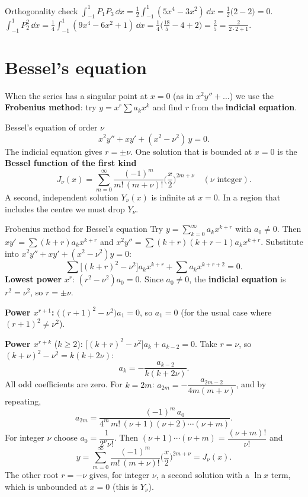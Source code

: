 \begin{examplebox}{Orthogonality check}
$\displaystyle\int_{-1}^1P_1P_3\,\dd x = \tfrac12\int_{-1}^1(5x^4 - 3x^2)\,\dd x = \tfrac12\big(2 - 2\big) = 0$.
\quad $\displaystyle\int_{-1}^1P_2^2\,\dd x = \tfrac14\int_{-1}^1(9x^4 - 6x^2 + 1)\,\dd x = \tfrac14\Big(\tfrac{18}{5} - 4 + 2\Big) = \tfrac25 = \tfrac{2}{2\cdot2+1}$. \checkmark
\end{examplebox}

\section{Bessel's equation}

When the series has a singular point at $x=0$ (as in $x^2y''+\dots$) we use the \textbf{Frobenius method}: try $y = x^r\sum a_kx^k$ and find $r$ from the \textbf{indicial equation}.

\begin{defbox}{Bessel's equation of order $\nu$}
\[ x^2y'' + xy' + (x^2-\nu^2)\,y = 0 . \]
The indicial equation gives $r=\pm\nu$. One solution that is bounded at $x=0$ is the \textbf{Bessel function of the first kind}
\[ J_\nu(x) = \sum_{m=0}^\infty\frac{(-1)^m}{m!\,(m+\nu)!}\Big(\frac x2\Big)^{2m+\nu}\quad(\nu\text{ integer}). \]
A second, independent solution $Y_\nu(x)$ is infinite at $x=0$. In a region that includes the centre we must drop $Y_\nu$.
\end{defbox}

\begin{derivbox}{Frobenius method for Bessel's equation}
Try $y = \sum_{k=0}^\infty a_kx^{k+r}$ with $a_0\neq0$. Then $xy' = \sum(k+r)a_kx^{k+r}$ and $x^2y'' = \sum(k+r)(k+r-1)a_kx^{k+r}$. Substitute into $x^2y'' + xy' + (x^2-\nu^2)y = 0$:
\[ \sum\Big[(k+r)^2 - \nu^2\Big]a_kx^{k+r} + \sum a_kx^{k+r+2} = 0. \]
\textbf{Lowest power} $x^r$: $(r^2-\nu^2)a_0 = 0$. Since $a_0\ne0$, the \textbf{indicial equation} is $r^2 = \nu^2$, so $r = \pm\nu$.

\textbf{Power $x^{r+1}$:} $\big((r+1)^2-\nu^2\big)a_1 = 0$, so $a_1 = 0$ (for the usual case where $(r+1)^2\ne\nu^2$).

\textbf{Power $x^{r+k}$} ($k\ge2$): $\big[(k+r)^2-\nu^2\big]a_k + a_{k-2} = 0$. Take $r=\nu$, so $(k+\nu)^2-\nu^2 = k(k+2\nu)$:
\[ a_k = -\frac{a_{k-2}}{k(k+2\nu)}. \]
All odd coefficients are zero. For $k = 2m$: $a_{2m} = -\dfrac{a_{2m-2}}{4m(m+\nu)}$, and by repeating,
\[ a_{2m} = \frac{(-1)^m\,a_0}{4^m\,m!\,(\nu+1)(\nu+2)\cdots(\nu+m)}. \]
For integer $\nu$ choose $a_0 = \dfrac{1}{2^\nu\nu!}$. Then $(\nu+1)\cdots(\nu+m) = \dfrac{(\nu+m)!}{\nu!}$ and
\[ y = \sum_{m=0}^\infty\frac{(-1)^m}{m!\,(m+\nu)!}\Big(\frac x2\Big)^{2m+\nu} = J_\nu(x). \]
The other root $r=-\nu$ gives, for integer $\nu$, a second solution with a $\ln x$ term, which is unbounded at $x=0$ (this is $Y_\nu$).
\end{derivbox}

